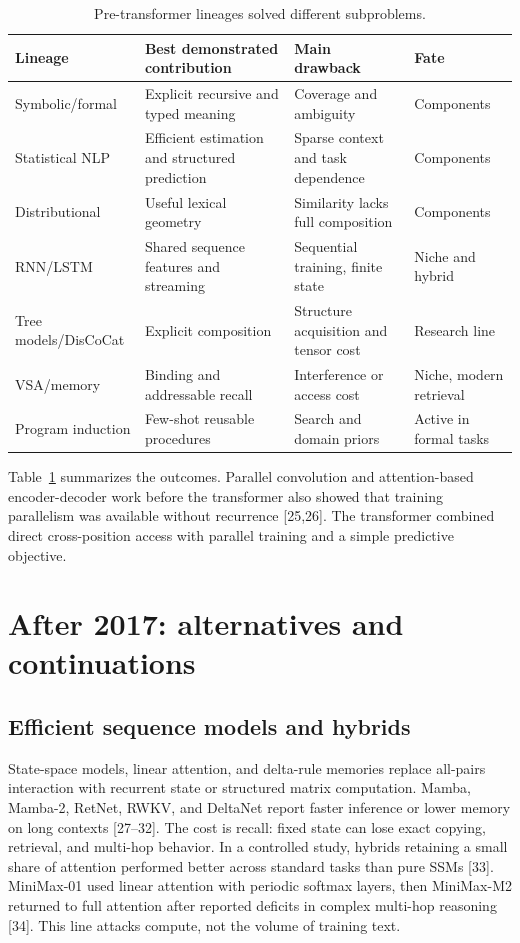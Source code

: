 \begin{table}[ht]
\centering\small
\begin{tabular}{p{3.1cm}p{4.2cm}p{3.2cm}p{2.1cm}}
\toprule Lineage & Best demonstrated contribution & Main drawback & Fate \\
\midrule
Symbolic/formal & Explicit recursive and typed meaning & Coverage and ambiguity & Components \\
Statistical NLP & Efficient estimation and structured prediction & Sparse context and task dependence & Components \\
Distributional & Useful lexical geometry & Similarity lacks full composition & Components \\
RNN/LSTM & Shared sequence features and streaming & Sequential training, finite state & Niche and hybrid \\
Tree models/DisCoCat & Explicit composition & Structure acquisition and tensor cost & Research line \\
VSA/memory & Binding and addressable recall & Interference or access cost & Niche, modern retrieval \\
Program induction & Few-shot reusable procedures & Search and domain priors & Active in formal tasks \\
\bottomrule
\end{tabular}
\caption{Pre-transformer lineages solved different subproblems.}
\label{tab:pre}
\end{table}
Table~\ref{tab:pre} summarizes the outcomes. Parallel convolution and attention-based encoder-decoder work before the transformer also showed that training parallelism was available without recurrence [25,26]. The transformer combined direct cross-position access with parallel training and a simple predictive objective.

\section{After 2017: alternatives and continuations}

\subsection{Efficient sequence models and hybrids}
State-space models, linear attention, and delta-rule memories replace all-pairs interaction with recurrent state or structured matrix computation. Mamba, Mamba-2, RetNet, RWKV, and DeltaNet report faster inference or lower memory on long contexts [27--32]. The cost is recall: fixed state can lose exact copying, retrieval, and multi-hop behavior. In a controlled study, hybrids retaining a small share of attention performed better across standard tasks than pure SSMs [33]. MiniMax-01 used linear attention with periodic softmax layers, then MiniMax-M2 returned to full attention after reported deficits in complex multi-hop reasoning [34]. This line attacks compute, not the volume of training text.

